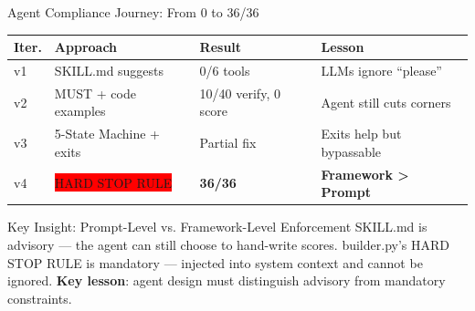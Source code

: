 \documentclass[aspectratio=169,11pt]{beamer}
\begin{document}
\begin{frame}{Agent Compliance Journey: From 0 to 36/36}
  \begin{center}
    \small
    \begin{tabular}{lp{3cm}p{3cm}p{4.5cm}}
      \toprule
      Iter. & Approach & Result & Lesson \\
      \midrule
      v1 & SKILL.md suggests & 0/6 tools & LLMs ignore ``please''\\
      v2 & MUST + code examples & 10/40 verify, 0 score & Agent still cuts corners\\
      v3 & 5-State Machine + exits & Partial fix & Exits help but bypassable\\
      v4 & \colorbox{red}{\color{white}HARD STOP RULE} & \textbf{36/36} & \textbf{Framework > Prompt}\\
      \bottomrule
    \end{tabular}
  \end{center}

  \vspace{0.3cm}
  \begin{block}{Key Insight: Prompt-Level vs. Framework-Level Enforcement}
    {\footnotesize SKILL.md is advisory --- the agent can still choose to hand-write scores. builder.py's HARD STOP RULE is mandatory --- injected into system context and cannot be ignored. \textbf{Key lesson}: agent design must distinguish advisory from mandatory constraints.}
  \end{block}
\end{frame}
\end{document}
